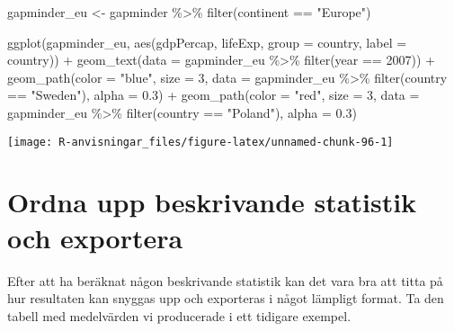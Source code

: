 \documentclass[
]{book}
\newenvironment{Shaded}{\begin{snugshade}}{\end{snugshade}}
\newcommand{\AttributeTok}[1]{\textcolor[rgb]{0.77,0.63,0.00}{#1}}
\newcommand{\DecValTok}[1]{\textcolor[rgb]{0.00,0.00,0.81}{#1}}
\newcommand{\FloatTok}[1]{\textcolor[rgb]{0.00,0.00,0.81}{#1}}
\newcommand{\FunctionTok}[1]{\textcolor[rgb]{0.00,0.00,0.00}{#1}}
\newcommand{\NormalTok}[1]{#1}
\newcommand{\OtherTok}[1]{\textcolor[rgb]{0.56,0.35,0.01}{#1}}
\newcommand{\SpecialCharTok}[1]{\textcolor[rgb]{0.00,0.00,0.00}{#1}}
\newcommand{\StringTok}[1]{\textcolor[rgb]{0.31,0.60,0.02}{#1}}
\theoremstyle{definition}
\theoremstyle{definition}
\theoremstyle{definition}
\theoremstyle{definition}
\theoremstyle{remark}
\begin{document}
\begin{Shaded}
\begin{Highlighting}[]
\NormalTok{gapminder\_eu }\OtherTok{\textless{}{-}}\NormalTok{ gapminder }\SpecialCharTok{\%\textgreater{}\%} \FunctionTok{filter}\NormalTok{(continent }\SpecialCharTok{==} \StringTok{"Europe"}\NormalTok{)}

\FunctionTok{ggplot}\NormalTok{(gapminder\_eu, }\FunctionTok{aes}\NormalTok{(gdpPercap, lifeExp, }\AttributeTok{group =}\NormalTok{ country, }\AttributeTok{label =}\NormalTok{ country)) }\SpecialCharTok{+}
  \FunctionTok{geom\_text}\NormalTok{(}\AttributeTok{data =}\NormalTok{ gapminder\_eu }\SpecialCharTok{\%\textgreater{}\%} \FunctionTok{filter}\NormalTok{(year }\SpecialCharTok{==} \DecValTok{2007}\NormalTok{)) }\SpecialCharTok{+}
  \FunctionTok{geom\_path}\NormalTok{(}\AttributeTok{color =} \StringTok{"blue"}\NormalTok{, }\AttributeTok{size =} \DecValTok{3}\NormalTok{, }\AttributeTok{data =}\NormalTok{ gapminder\_eu }\SpecialCharTok{\%\textgreater{}\%} \FunctionTok{filter}\NormalTok{(country }\SpecialCharTok{==} \StringTok{"Sweden"}\NormalTok{), }\AttributeTok{alpha =} \FloatTok{0.3}\NormalTok{) }\SpecialCharTok{+}
  \FunctionTok{geom\_path}\NormalTok{(}\AttributeTok{color =} \StringTok{"red"}\NormalTok{, }\AttributeTok{size =} \DecValTok{3}\NormalTok{, }\AttributeTok{data =}\NormalTok{ gapminder\_eu }\SpecialCharTok{\%\textgreater{}\%} \FunctionTok{filter}\NormalTok{(country }\SpecialCharTok{==} \StringTok{"Poland"}\NormalTok{), }\AttributeTok{alpha =} \FloatTok{0.3}\NormalTok{)}
\end{Highlighting}
\end{Shaded}

\begin{center}\texttt{[image: R-anvisningar\_files/figure-latex/unnamed-chunk-96-1]} \end{center}

\hypertarget{ordna-upp-beskrivande-statistik-och-exportera}{%
\section{Ordna upp beskrivande statistik och exportera}\label{ordna-upp-beskrivande-statistik-och-exportera}}

Efter att ha beräknat någon beskrivande statistik kan det vara bra att titta på hur resultaten kan snyggas upp och exporteras i något lämpligt format. Ta den tabell med medelvärden vi producerade i ett tidigare exempel.
\end{document}
